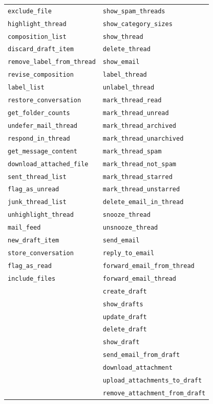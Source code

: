 \documentclass[11pt]{article}
\begin{document}
\begin{longtable}{ll}
\texttt{exclude\_file} & \texttt{show\_spam\_threads} \\
\texttt{highlight\_thread} & \texttt{show\_category\_sizes} \\
\texttt{composition\_list} & \texttt{show\_thread} \\
\texttt{discard\_draft\_item} & \texttt{delete\_thread} \\
\texttt{remove\_label\_from\_thread} & \texttt{show\_email} \\
\texttt{revise\_composition} & \texttt{label\_thread} \\
\texttt{label\_list} & \texttt{unlabel\_thread} \\
\texttt{restore\_conversation} & \texttt{mark\_thread\_read} \\
\texttt{get\_folder\_counts} & \texttt{mark\_thread\_unread} \\
\texttt{undefer\_mail\_thread} & \texttt{mark\_thread\_archived} \\
\texttt{respond\_in\_thread} & \texttt{mark\_thread\_unarchived} \\
\texttt{get\_message\_content} & \texttt{mark\_thread\_spam} \\
\texttt{download\_attached\_file} & \texttt{mark\_thread\_not\_spam} \\
\texttt{sent\_thread\_list} & \texttt{mark\_thread\_starred} \\
\texttt{flag\_as\_unread} & \texttt{mark\_thread\_unstarred} \\
\texttt{junk\_thread\_list} & \texttt{delete\_email\_in\_thread} \\
\texttt{unhighlight\_thread} & \texttt{snooze\_thread} \\
\texttt{mail\_feed} & \texttt{unsnooze\_thread} \\
\texttt{new\_draft\_item} & \texttt{send\_email} \\
\texttt{store\_conversation} & \texttt{reply\_to\_email} \\
\texttt{flag\_as\_read} & \texttt{forward\_email\_from\_thread} \\
\texttt{include\_files} & \texttt{forward\_email\_thread} \\
 & \texttt{create\_draft} \\
 & \texttt{show\_drafts} \\
 & \texttt{update\_draft} \\
 & \texttt{delete\_draft} \\
 & \texttt{show\_draft} \\
 & \texttt{send\_email\_from\_draft} \\
 & \texttt{download\_attachment} \\
 & \texttt{upload\_attachments\_to\_draft} \\
 & \texttt{remove\_attachment\_from\_draft} \\
\end{longtable}
\end{document}
